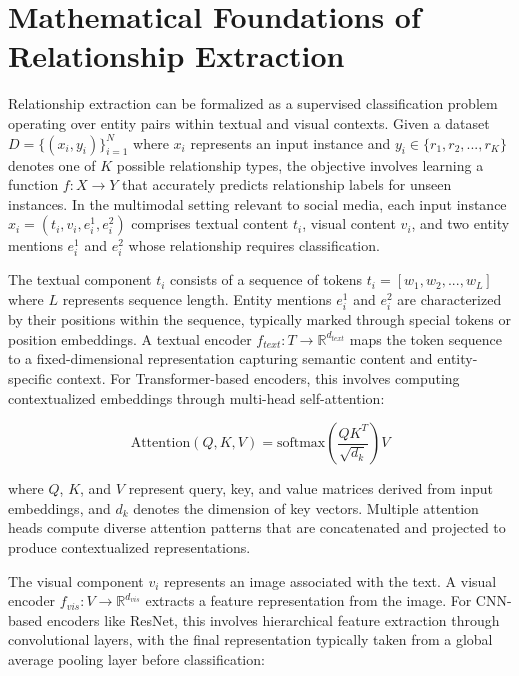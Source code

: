 \documentclass[12pt,a4paper]{report}
\begin{document}
\section{Mathematical Foundations of Relationship Extraction}

Relationship extraction can be formalized as a supervised classification problem operating over entity pairs within textual and visual contexts. Given a dataset $D = \{(x_i, y_i)\}_{i=1}^N$ where $x_i$ represents an input instance and $y_i \in \{r_1, r_2, ..., r_K\}$ denotes one of $K$ possible relationship types, the objective involves learning a function $f: X \rightarrow Y$ that accurately predicts relationship labels for unseen instances. In the multimodal setting relevant to social media, each input instance $x_i = (t_i, v_i, e_i^1, e_i^2)$ comprises textual content $t_i$, visual content $v_i$, and two entity mentions $e_i^1$ and $e_i^2$ whose relationship requires classification.

The textual component $t_i$ consists of a sequence of tokens $t_i = [w_1, w_2, ..., w_L]$ where $L$ represents sequence length. Entity mentions $e_i^1$ and $e_i^2$ are characterized by their positions within the sequence, typically marked through special tokens or position embeddings. A textual encoder $f_{text}: T \rightarrow \mathbb{R}^{d_{text}}$ maps the token sequence to a fixed-dimensional representation capturing semantic content and entity-specific context. For Transformer-based encoders, this involves computing contextualized embeddings through multi-head self-attention:

\begin{equation}
\text{Attention}(Q, K, V) = \text{softmax}\left(\frac{QK^T}{\sqrt{d_k}}\right)V
\end{equation}

where $Q$, $K$, and $V$ represent query, key, and value matrices derived from input embeddings, and $d_k$ denotes the dimension of key vectors. Multiple attention heads compute diverse attention patterns that are concatenated and projected to produce contextualized representations.

The visual component $v_i$ represents an image associated with the text. A visual encoder $f_{vis}: V \rightarrow \mathbb{R}^{d_{vis}}$ extracts a feature representation from the image. For CNN-based encoders like ResNet, this involves hierarchical feature extraction through convolutional layers, with the final representation typically taken from a global average pooling layer before classification:
\end{document}
